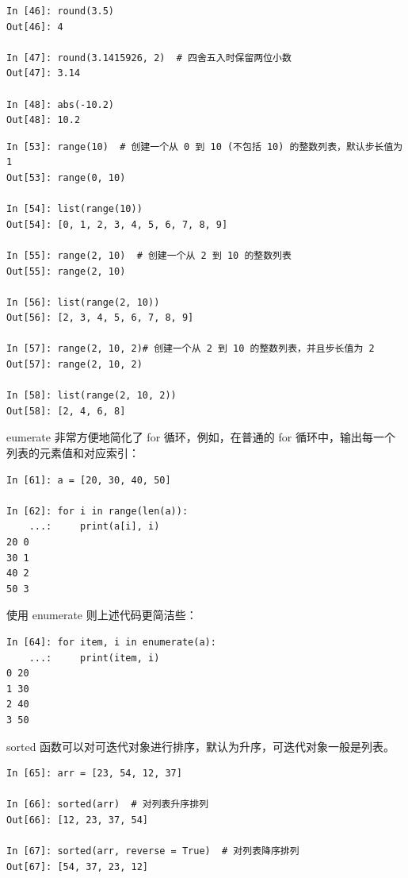 \begin{lstlisting}[Language=Python]
In [46]: round(3.5)
Out[46]: 4

In [47]: round(3.1415926, 2)  # 四舍五入时保留两位小数
Out[47]: 3.14

In [48]: abs(-10.2)
Out[48]: 10.2
\end{lstlisting}

\begin{lstlisting}[Language=Python]
In [53]: range(10)  # 创建一个从 0 到 10 (不包括 10) 的整数列表，默认步长值为 1
Out[53]: range(0, 10)

In [54]: list(range(10))
Out[54]: [0, 1, 2, 3, 4, 5, 6, 7, 8, 9]

In [55]: range(2, 10)  # 创建一个从 2 到 10 的整数列表
Out[55]: range(2, 10)

In [56]: list(range(2, 10))
Out[56]: [2, 3, 4, 5, 6, 7, 8, 9]

In [57]: range(2, 10, 2)# 创建一个从 2 到 10 的整数列表，并且步长值为 2
Out[57]: range(2, 10, 2)

In [58]: list(range(2, 10, 2))
Out[58]: [2, 4, 6, 8]
\end{lstlisting}

eumerate 非常方便地简化了 for 循环，例如，在普通的 for 循环中，输出每一个列表的元素值和对应索引：

\begin{lstlisting}[Language=Python]
In [61]: a = [20, 30, 40, 50]

In [62]: for i in range(len(a)):
    ...:     print(a[i], i)
20 0
30 1
40 2
50 3
\end{lstlisting}

使用 enumerate 则上述代码更简洁些：

\begin{lstlisting}[Language=Python]
In [64]: for item, i in enumerate(a):
    ...:     print(item, i)
0 20
1 30
2 40
3 50
\end{lstlisting}


sorted 函数可以对可迭代对象进行排序，默认为升序，可迭代对象一般是列表。

\begin{lstlisting}[Language=Python]
In [65]: arr = [23, 54, 12, 37]

In [66]: sorted(arr)  # 对列表升序排列
Out[66]: [12, 23, 37, 54]

In [67]: sorted(arr, reverse = True)  # 对列表降序排列
Out[67]: [54, 37, 23, 12]
\end{lstlisting}
